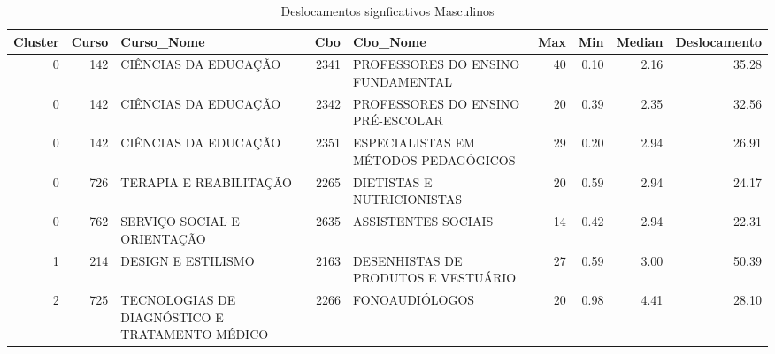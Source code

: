 \begin{table}
\centering
\caption{Deslocamentos signficativos Masculinos}
\label{tab:Salarios_Desequlibrio_M_2}
\begin{tabular}{rrlrlrrrr}
\toprule
 Cluster &  Curso &                                     Curso\_Nome &  Cbo &                             Cbo\_Nome &  Max &  Min &  Median &  Deslocamento \\
\midrule
       0 &    142 &                           CIÊNCIAS DA EDUCAÇÃO & 2341 &    PROFESSORES DO ENSINO FUNDAMENTAL &   40 & 0.10 &    2.16 &         35.28 \\
       0 &    142 &                           CIÊNCIAS DA EDUCAÇÃO & 2342 &    PROFESSORES DO ENSINO PRÉ-ESCOLAR &   20 & 0.39 &    2.35 &         32.56 \\
       0 &    142 &                           CIÊNCIAS DA EDUCAÇÃO & 2351 & ESPECIALISTAS EM MÉTODOS PEDAGÓGICOS &   29 & 0.20 &    2.94 &         26.91 \\
       0 &    726 &                         TERAPIA E REABILITAÇÃO & 2265 &           DIETISTAS E NUTRICIONISTAS &   20 & 0.59 &    2.94 &         24.17 \\
       0 &    762 &                    SERVIÇO SOCIAL E ORIENTAÇÃO & 2635 &                  ASSISTENTES SOCIAIS &   14 & 0.42 &    2.94 &         22.31 \\
       1 &    214 &                             DESIGN E ESTILISMO & 2163 & DESENHISTAS DE PRODUTOS E  VESTUÁRIO &   27 & 0.59 &    3.00 &         50.39 \\
       2 &    725 & TECNOLOGIAS DE DIAGNÓSTICO E TRATAMENTO MÉDICO & 2266 &                       FONOAUDIÓLOGOS &   20 & 0.98 &    4.41 &         28.10 \\
\bottomrule
\end{tabular}
\end{table}
